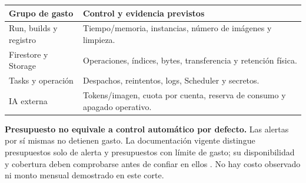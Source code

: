 \small
\begin{tabularx}{\linewidth}{P{3cm}Y}
\toprule
\textbf{Grupo de gasto} & \textbf{Control y evidencia previstos}\\
\midrule
Run, builds y registro & Tiempo/memoria, instancias, número de imágenes y limpieza.\\
Firestore y Storage & Operaciones, índices, bytes, transferencia y retención física.\\
Tasks y operación & Despachos, reintentos, logs, Scheduler y secretos.\\
IA externa & Tokens/imagen, cuota por cuenta, reserva de consumo y apagado operativo.\\
\bottomrule
\end{tabularx}
\normalsize
\textbf{Presupuesto no equivale a control automático por defecto.} Las alertas por sí mismas no detienen gasto. La documentación vigente distingue presupuestos solo de alerta y presupuestos con límite de gasto; su disponibilidad y cobertura deben comprobarse antes de confiar en ellos \cite{budgets}. No hay costo observado ni monto mensual demostrado en este corte.
